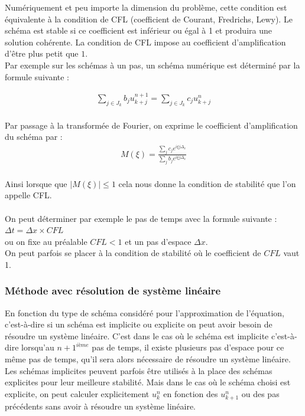 \documentclass[12pt]{article}
\begin{document}
\noindent Numériquement et peu importe la dimension du problème, cette condition est équivalente à la condition de CFL \cite{ref9} (coefficient de Courant, Fredrichs, Lewy).
Le schéma est stable si ce coefficient est inférieur ou égal à 1 et produira une solution cohérente. 
La condition de CFL impose au coefficient d'amplification d'être plus petit que $1$.
\\Par exemple sur les schémas à un pas, un schéma numérique est déterminé par la formule suivante :

\begin{eqnarray*}
    \sum_{j\in J_k} b_ju_{k+j}^{n+1} = \sum_{j\in J_k} c_ju_{k+j}^{n} 
\end{eqnarray*}
\\Par passage à la transformée de Fourier, on exprime le coefficient d'amplification du schéma par :
\begin{eqnarray*}
     M(\xi)=\frac{\sum_j c_j e^{i\xi j \Delta_x}}{\sum_j b_j e^{i \xi j\Delta_x }}
\end{eqnarray*}
\\Ainsi lorsque que $|M(\xi)|\leq 1$ cela nous donne la condition de stabilité que l'on appelle CFL.
\\
\\
On peut déterminer par exemple le pas de temps avec la formule suivante :
$\Delta t = \Delta x \times CFL$
\\ou on fixe au préalable $CFL < 1$ et un pas d'espace $\Delta x$.
\\On peut parfois se placer à la condition de stabilité où le coefficient de $CFL$ vaut 1.
\\
\subsubsection{Méthode avec résolution de système linéaire}\noindent En fonction du type de schéma considéré pour l'approximation de l'équation,  c'est-à-dire si un schéma est implicite ou explicite on peut avoir besoin de résoudre un système linéaire. C'est dans le cas où le schéma est implicite c'est-à-dire lorsqu'au $n+1^{ième}$ pas de temps, il existe plusieurs pas d'espace pour ce même pas de temps, qu'il sera alors nécessaire de résoudre un système linéaire.
Les schémas implicites peuvent parfois être utilisés à la place des schémas explicites pour leur meilleure stabilité. 
Mais dans le cas où le schéma choisi est explicite, on peut calculer explicitement $u_k^n$ en fonction des $u_{k+1}^{n}$ ou des pas précédents sans avoir à résoudre un système linéaire.
\end{document}
